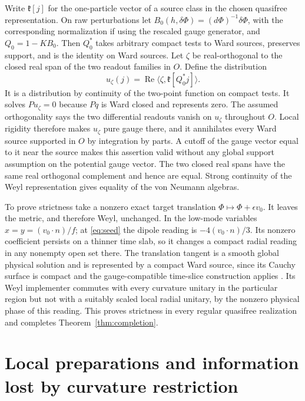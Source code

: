 \documentclass[11pt]{article}
\begin{document}
Write \(\mathfrak k[j]\) for the one-particle vector of a source class in the chosen quasifree representation. On raw perturbations let \(B_0(h,\delta\Phi)=(d\Phi)^{-1}\delta\Phi\), with the corresponding normalization if using the rescaled gauge generator, and \(Q_0=1-KB_0\). Then \(Q_0^*\) takes arbitrary compact tests to Ward sources, preserves support, and is the identity on Ward sources. Let \(\zeta\) be real-orthogonal to the closed real span of the two readout families in \(O\). Define the distribution
\[
 u_\zeta(j)=\operatorname{Re}\langle\zeta,\mathfrak k[Q_0^*j]\rangle .
\]
It is a distribution by continuity of the two-point function on compact tests. It solves \(Pu_\zeta=0\) because \(Pq\) is Ward closed and represents zero. The assumed orthogonality says the two differential readouts vanish on \(u_\zeta\) throughout \(O\). Local rigidity therefore makes \(u_\zeta\) pure gauge there, and it annihilates every Ward source supported in \(O\) by integration by parts. A cutoff of the gauge vector equal to it near the source makes this assertion valid without any global support assumption on the potential gauge vector. The two closed real spans have the same real orthogonal complement and hence are equal. Strong continuity of the Weyl representation gives equality of the von Neumann algebras.

To prove strictness take a nonzero exact target translation \(\Phi\mapsto\Phi+\epsilon v_0\). It leaves the metric, and therefore Weyl, unchanged. In the low-mode variables \(x=y=(v_0\cdot n)/f\); at \eqref{eq:seed} the dipole reading is \(-4(v_0\cdot n)/3\). Its nonzero coefficient persists on a thinner time slab, so it changes a compact radial reading in any nonempty open set there. The translation tangent is a smooth global physical solution and is represented by a compact Ward source, since its Cauchy surface is compact and the gauge-compatible time-slice construction applies \cite{p09,hackschenkel}. Its Weyl implementer commutes with every curvature unitary in the particular region but not with a suitably scaled local radial unitary, by the nonzero physical phase of this reading. This proves strictness in every regular quasifree realization and completes Theorem~\ref{thm:completion}.

\section{Local preparations and information lost by curvature restriction}
\end{document}
